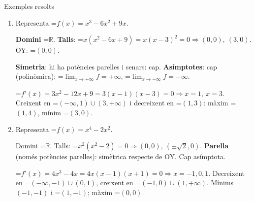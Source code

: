\documentclass[11pt,a4paper]{article}
\newcommand{\fmm}[1]{\setbox0=\hbox{$#1$}\ifdim\wd0>\linewidth\[#1\]\else\mbox{\box0}\fi}
\begin{document}
  
\begin{fmex}{Exemples resolts}
\begin{enumerate}[label=\textbf{\arabic*.},leftmargin=*]
\item Representa \fmm{f(x)=x^3-6x^2+9x}.
          

            

\textbf{Domini} \fmm{\mathbb R}. \textbf{Talls}: \fmm{x(x^2-6x+9)=x(x-3)^2=0\Rightarrow(0,0),\ (3,0)}. OY: \fmm{(0,0)}.

            

\textbf{Simetria}: hi ha potències parelles i senars: cap. \textbf{Asímptotes}: cap (polinòmica); \fmm{\lim_{x\to+\infty}f=+\infty}, \fmm{\lim_{x\to-\infty}f=-\infty}.

            

\fmm{f'(x)=3x^2-12x+9=3(x-1)(x-3)=0\Rightarrow x=1,\ x=3}. Creixent en \fmm{(-\infty,1)\cup(3,+\infty)} i decreixent en \fmm{(1,3)}: màxim \fmm{(1,4)}, mínim \fmm{(3,0)}.

            

\begin{center}\end{center}
\item Representa \fmm{f(x)=x^4-2x^2}.
          

            

Domini \fmm{\mathbb R}. Talls: \fmm{x^2(x^2-2)=0\Rightarrow(0,0),\ (\pm\sqrt2,0)}. \textbf{Parella} (només potències parelles): simètrica respecte de OY. Cap asímptota.

            

\fmm{f'(x)=4x^3-4x=4x(x-1)(x+1)=0\Rightarrow x=-1,0,1}. Decreixent en \fmm{(-\infty,-1)\cup(0,1)}, creixent en \fmm{(-1,0)\cup(1,+\infty)}. Mínims \fmm{(-1,-1)} i \fmm{(1,-1)}; màxim \fmm{(0,0)}.


\end{enumerate}
\end{fmex}
\end{document}
